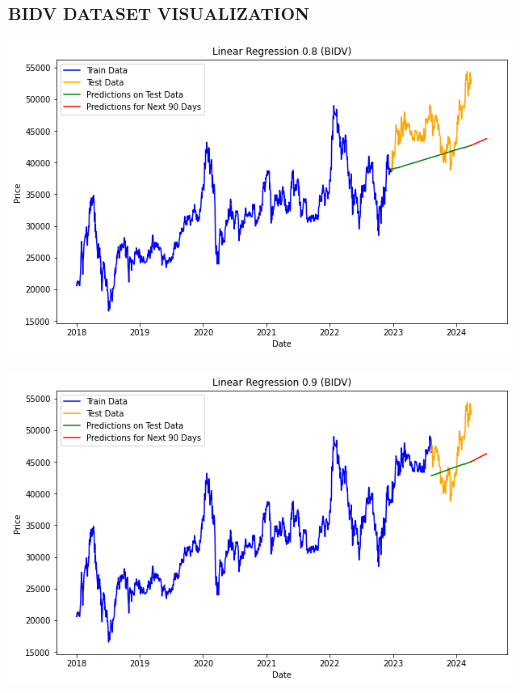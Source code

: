 \documentclass[conference]{IEEEtran}
\begin{document}
\subsubsection{BIDV DATASET VISUALIZATION}

\begin{minipage}{0.23\textwidth}
    \centering
    \includegraphics[width=\linewidth]{images/LR/LinearRegression_BIDV_90days_82.png}
    \label{fig:image1}
\end{minipage}
\hfill
\begin{minipage}{0.23\textwidth}
    \centering
    \includegraphics[width=\linewidth]{images/LR/LinearRegression_BIDV_90days_91.png}
    \label{fig:image2}
\end{minipage}
\end{document}
